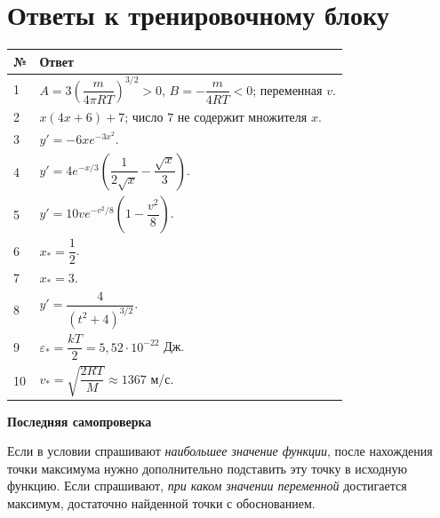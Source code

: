 \documentclass[a4paper,12pt]{article}
\begin{document}
\section*{Ответы к тренировочному блоку}
\renewcommand{\arraystretch}{1.42}
\begin{tabularx}{\linewidth}{@{}p{.075\linewidth}X@{}}
\toprule
\textbf{№} & \textbf{Ответ} \\ \midrule
1 & $A=3\left(\dfrac{m}{4\pi RT}\right)^{3/2}>0$, $B=-\dfrac{m}{4RT}<0$; переменная $v$.\\
2 & $x(4x+6)+7$; число $7$ не содержит множителя $x$.\\
3 & $y'=-6xe^{-3x^2}$.\\
4 & $y'=4e^{-x/3}\left(\dfrac1{2\sqrt{x}}-\dfrac{\sqrt{x}}3\right)$.\\
5 & $y'=10ve^{-v^2/8}\left(1-\dfrac{v^2}{8}\right)$.\\
6 & $x_*=\dfrac12$.\\
7 & $x_*=3$.\\
8 & $y'=\dfrac{4}{(t^2+4)^{3/2}}$.\\
9 & $\varepsilon_*=\dfrac{kT}{2}=5{,}52\cdot10^{-22}$ Дж.\\
10 & $v_*=\sqrt{\dfrac{2RT}{M}}\approx1367$ м/с.\\
\bottomrule
\end{tabularx}
\vspace{10mm}
\textcolor{accentdark}{\textbf{Последняя самопроверка}}\par
Если в условии спрашивают \emph{наибольшее значение функции}, после нахождения точки максимума нужно дополнительно подставить эту точку в исходную функцию. Если спрашивают, \emph{при каком значении переменной} достигается максимум, достаточно найденной точки с обоснованием.
\end{document}
